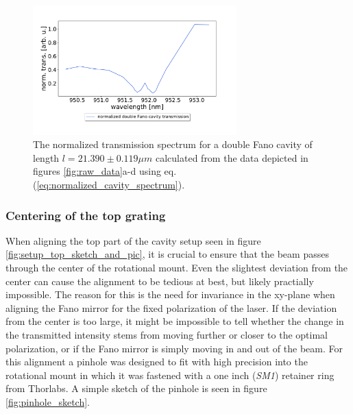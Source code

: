 \begin{figure}[h!]
    \centering
    \includegraphics[width=0.7\textwidth]{figures/raw_data_normalized_transmission.pdf}
    \caption{The normalized transmission spectrum for a double Fano cavity of length $l=21.390 \pm 0.119 \mu m$ calculated from the data depicted in figures \ref{fig:raw_data}a-d using eq. (\ref{eq:normalized_cavity_spectrum}).}
    \label{fig:raw_data_normalized_transmission}
\end{figure}

\subsubsection{Centering of the top grating}\label{sec:pinhole_method}

When aligning the top part of the cavity setup seen in figure \ref{fig:setup_top_sketch_and_pic}, it is crucial to ensure that the beam passes through the center of the rotational mount. Even the slightest deviation from the center can cause the alignment to be tedious at best, but likely practially impossible. The reason for this is the need for invariance in the xy-plane when aligning the Fano mirror for the fixed polarization of the laser. If the deviation from the center is too large, it might be impossible to tell whether the change in the transmitted intensity stems from moving further or closer to the optimal polarization, or if the Fano mirror is simply moving in and out of the beam. For this alignment a pinhole was designed to fit with high precision into the rotational mount in which it was fastened with a one inch (\emph{SM1}) retainer ring from Thorlabs. A simple sketch of the pinhole is seen in figure \ref{fig:pinhole_sketch}.

